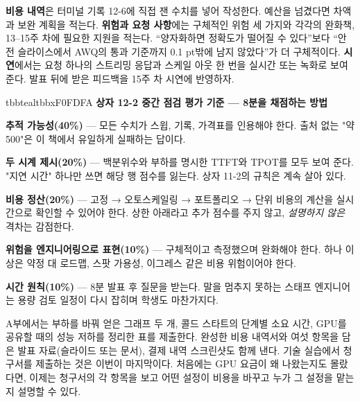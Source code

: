 \textbf{비용 내역}은 터미널 기록 12-6에 직접 잰 수치를 넣어 작성한다. 예산을 넘겼다면 차액과 보완 계획을 적는다. \textbf{위험과 요청 사항}에는 구체적인 위험 세 가지와 각각의 완화책, 13–15주 차에 필요한 지원을 적는다. “양자화하면 정확도가 떨어질 수 있다”보다 “안전 슬라이스에서 AWQ의 통과 기준까지 0.1 pt밖에 남지 않았다”가 더 구체적이다. \textbf{시연}에서는 요청 하나의 스트리밍 응답과 스케일 아웃 한 번을 실시간 또는 녹화로 보여 준다. 발표 뒤에 받은 피드백을 15주 차 시연에 반영하자.

\begin{calloutbox}{tbbteal}{tbbxF0FDFA}
{\normalsize\bfseries\color{tbbx115E59}상자 12-2  중간 점검 평가 기준 — 8분을 채점하는 방법}\par\vspace{3pt}
\begin{tbbitemize}
  \item \textbf{추적 가능성(40\%)} — 모든 수치가 스윕, 기록, 가격표를 인용해야 한다. 출처 없는 "약 500"은 이 책에서 유일하게 실패하는 답이다.
  \item \textbf{두 시계 제시(20\%)} — 백분위수와 부하를 명시한 TTFT와 TPOT를 모두 보여 준다. "지연 시간" 하나만 쓰면 해당 행 점수를 잃는다. 상자 11-2의 규칙은 계속 살아 있다.
  \item \textbf{비용 정산(20\%)} — 고정 → 오토스케일링 → 포트폴리오 → 단위 비용의 계산을 실시간으로 확인할 수 있어야 한다. 상한 아래라고 추가 점수를 주지 않고, \textit{설명하지 않은} 격차는 감점한다.
  \item \textbf{위험을 엔지니어링으로 표현(10\%)} — 구체적이고 측정했으며 완화해야 한다. 하나 이상은 약정 대 로드맵, 스팟 가용성, 이그레스 같은 비용 위험이어야 한다.
  \item \textbf{시간 원칙(10\%)} — 8분 발표 후 질문을 받는다. 말을 멈추지 못하는 스태프 엔지니어는 용량 검토 일정이 다시 잡히며 학생도 마찬가지다.
\end{tbbitemize}
\end{calloutbox}

\vspace{3.0pt}

A부에서는 부하를 바꿔 얻은 그래프 두 개, 콜드 스타트의 단계별 소요 시간, GPU를 공유할 때의 성능 저하를 정리한 표를 제출한다. 완성한 비용 내역서와 여섯 항목을 담은 발표 자료(슬라이드 또는 문서), 결제 내역 스크린샷도 함께 낸다. 기술 실습에서 청구서를 제출하는 것은 이번이 마지막이다. 처음에는 GPU 요금이 왜 나왔는지도 몰랐다면, 이제는 청구서의 각 항목을 보고 어떤 설정이 비용을 바꾸고 누가 그 설정을 맡는지 설명할 수 있다.

